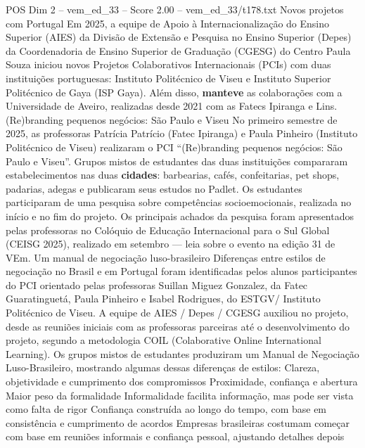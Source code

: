 \begin{textsample}{POS Dim 2 – vem\_ed\_33 – Score 2.00 – vem\_ed\_33/t178.txt}  \label{ex:f2_pos_147}
Novos projetos com Portugal Em 2025, a equipe de Apoio à Internacionalização do Ensino Superior (AIES) da Divisão de Extensão e Pesquisa no Ensino Superior (Depes) da Coordenadoria de Ensino Superior de Graduação (CGESG) do Centro Paula Souza iniciou novos Projetos Colaborativos Internacionais (PCIs) com duas instituições portuguesas: Instituto Politécnico de Viseu e Instituto Superior Politécnico de Gaya (ISP Gaya).
Além disso, \textbf{manteve} as colaborações com a Universidade de Aveiro, realizadas desde 2021 com as Fatecs Ipiranga e Lins. (Re)branding pequenos negócios: São Paulo e Viseu No primeiro semestre de 2025, as professoras Patrícia Patrício (Fatec Ipiranga) e Paula Pinheiro (Instituto Politécnico de Viseu) realizaram o PCI “(Re)branding pequenos negócios: São Paulo e Viseu”.
Grupos mistos de estudantes das duas instituições compararam estabelecimentos nas duas \textbf{cidades}: barbearias, cafés, confeitarias, pet shops, padarias, adegas e publicaram seus estudos no Padlet.
Os estudantes participaram de uma pesquisa sobre competências socioemocionais, realizada no início e no fim do projeto.
Os principais achados da pesquisa foram apresentados pelas professoras no Colóquio de Educação Internacional para o Sul Global (CEISG 2025), realizado em setembro — leia sobre o evento na edição 31 de VEm.
Um manual de negociação luso-brasileiro Diferenças entre estilos de negociação no Brasil e em Portugal foram identificadas pelos alunos participantes do PCI orientado pelas professoras Suillan Miguez Gonzalez, da Fatec Guaratinguetá, Paula Pinheiro e Isabel Rodrigues, do ESTGV/ Instituto Politécnico de Viseu.
A equipe de AIES / Depes / CGESG auxiliou no projeto, desde as reuniões iniciais com as professoras parceiras até o desenvolvimento do projeto, segundo a metodologia COIL (Colaborative Online International Learning).
Os grupos mistos de estudantes produziram um Manual de Negociação Luso-Brasileiro, mostrando algumas dessas diferenças de estilos: Clareza, objetividade e cumprimento dos compromissos Proximidade, confiança e abertura Maior peso da formalidade Informalidade facilita informação, mas pode ser vista como falta de rigor Confiança construída ao longo do tempo, com base em consistência e cumprimento de acordos Empresas brasileiras costumam começar com base em reuniões informais e confiança pessoal, ajustando detalhes depois

\end{textsample}
